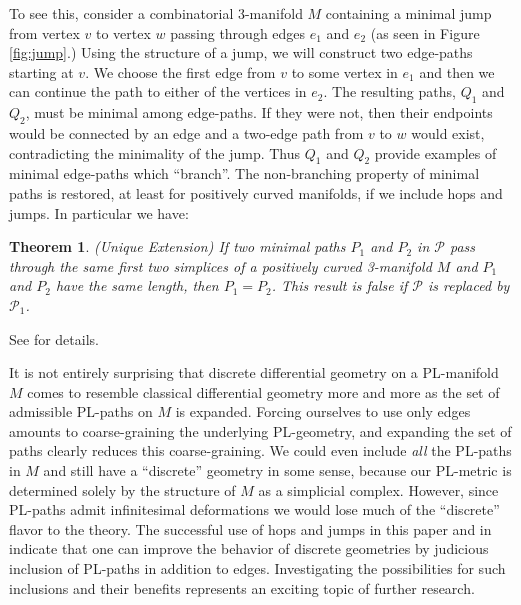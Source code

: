 \documentclass[12pt]{article}
\theoremstyle{plain}
\newtheorem{theorem}{Theorem}
\theoremstyle{definition}
\theoremstyle{remark}
\begin{document}
To see this, consider a combinatorial 3-manifold $M$ containing a minimal jump from vertex $v$ to vertex $w$ passing through edges $e_1$ and $e_2$ (as seen in Figure \ref{fig:jump}.) Using the structure of a jump, we will construct two edge-paths starting at $v$. We choose the first edge from $v$ to some vertex in $e_1$ and then we can continue the path to either of the vertices in $e_2$. The resulting paths, $Q_1$ and $Q_2$, must be minimal among edge-paths. If they were not, then their endpoints would be connected by an edge and a two-edge path from $v$ to $w$ would exist, contradicting the minimality of the jump. Thus $Q_1$ and $Q_2$ provide examples of minimal edge-paths which ``branch''. The non-branching property of minimal paths is restored, at least for positively curved manifolds, if we include hops and jumps. In particular we have:

\begin{theorem}(Unique Extension) If two minimal paths $P_1$ and $P_2$ in $\mathcal{P}$ pass through the same first two simplices of a positively curved 3-manifold $M$ and $P_1$ and $P_2$ have the same length, then $P_1 = P_2$. This result is false if $\mathcal{P}$ is replaced by $\mathcal{P}_1$.
\end{theorem}

\noindent See \cite{Trout10} for details.

It is not entirely surprising that discrete differential geometry on a PL-manifold $M$ comes to resemble classical differential geometry more and more as the set of admissible PL-paths on $M$ is expanded. Forcing ourselves to use only edges amounts to coarse-graining the underlying PL-geometry, and expanding the set of paths clearly reduces this coarse-graining. We could even include {\em all} the PL-paths in $M$ and still have a ``discrete'' geometry in some sense, because our PL-metric is determined solely by the structure of $M$ as a simplicial complex. However, since PL-paths admit infinitesimal deformations we would lose much of the ``discrete'' flavor to the theory. The successful use of hops and jumps in this paper and in \cite{Trout10} indicate that one can improve the behavior of discrete geometries by judicious inclusion of PL-paths in addition to edges. Investigating the possibilities for such inclusions and their benefits represents an exciting topic of further research.


\end{document}
